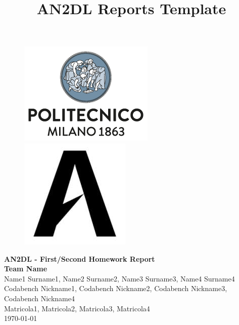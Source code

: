 \documentclass[11pt]{article}
\title{AN2DL Reports Template}
\begin{document}
    
    \begin{figure}[H]
        \raggedright
        \includegraphics[scale=0.4]{polimi.png} \hfill \includegraphics[scale=0.3]{airlab.jpeg}
    \end{figure}
    
    \vspace{5mm}
    
    \begin{center}
        {\Large \textbf{AN2DL - First/Second Homework Report}}\\
        \vspace{2mm}
        {\Large \textbf{Team Name}}\\
        \vspace{2mm}
        {\large Name1 Surname1,}
        {\large Name2 Surname2,}
        {\large Name3 Surname3,}
        {\large Name4 Surname4}\\
        \vspace{2mm}
        {Codabench Nickname1,}
        {Codabench Nickname2,}
        {Codabench Nickname3,} %
        {Codabench Nickname4}\\ 
        \vspace{2mm}
        {Matricola1,}
        {Matricola2,}
        {Matricola3,} %
        {Matricola4}\\ 
        \vspace{5mm}
        \today
    \end{center}    
    \vspace{5mm}
    
\end{document}
